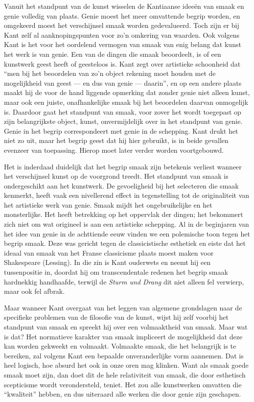 Vanuit het standpunt van de kunst wisselen de Kantiaanse ideeën van smaak en genie volledig van plaats. Genie moest het meer omvattende begrip worden, en omgekeerd moest het verschijnsel smaak worden gedevalueerd. Toch zijn er bij Kant zelf al aanknopingspunten voor zo’n omkering van waarden. Ook volgens Kant is het voor het oordelend vermogen van smaak van enig belang dat kunst het werk is van genie. Een van de dingen die smaak beoordeelt, is of een kunstwerk geest heeft of geesteloos is. Kant zegt over artistieke schoonheid dat ``men bij het beoordelen van zo’n object rekening moet houden met de mogelijkheid van geest — en dus van genie — daarin'', en op een andere plaats maakt hij de voor de hand liggende opmerking dat zonder genie niet alleen kunst, maar ook een juiste, onafhankelijke smaak bij het beoordelen daarvan onmogelijk is. Daardoor gaat het standpunt van smaak, voor zover het wordt toegepast op zijn belangrijkste object, kunst, onvermijdelijk over in het standpunt van genie. Genie in het begrip correspondeert met genie in de schepping. Kant drukt het niet zo uit, maar het begrip geest dat hij hier gebruikt, is in beide gevallen evenzeer van toepassing. Hierop moet later verder worden voortgebouwd.

Het is inderdaad duidelijk dat het begrip smaak zijn betekenis verliest wanneer het verschijnsel kunst op de voorgrond treedt. Het standpunt van smaak is ondergeschikt aan het kunstwerk. De gevoeligheid bij het selecteren die smaak kenmerkt, heeft vaak een nivellerend effect in tegenstelling tot de originaliteit van het artistieke werk van genie. Smaak mijdt het ongebruikelijke en het monsterlijke. Het heeft betrekking op het oppervlak der dingen; het bekommert zich niet om wat origineel is aan een artistieke schepping. Al in de beginjaren van het idee van genie in de achttiende eeuw vinden we een polemische toon tegen het begrip smaak. Deze was gericht tegen de classicistische esthetiek en eiste dat het ideaal van smaak van het Franse classicisme plaats moest maken voor Shakespeare (Lessing). In die zin is Kant ouderwets en neemt hij een tussenpositie in, doordat hij om transcendentale redenen het begrip smaak hardnekkig handhaafde, terwijl de \textit{Sturm und Drang} dit niet alleen fel verwierp, maar ook fel afbrak.

Maar wanneer Kant overgaat van het leggen van algemene grondslagen naar de specifieke problemen van de filosofie van de kunst, wijst hij zelf voorbij het standpunt van smaak en spreekt hij over een volmaaktheid van smaak. Maar wat is dat? Het normatieve karakter van smaak impliceert de mogelijkheid dat deze kan worden gekweekt en volmaakt. Volmaakte smaak, die het belangrijk is te bereiken, zal volgens Kant een bepaalde onveranderlijke vorm aannemen. Dat is heel logisch, hoe absurd het ook in onze oren mag klinken. Want als smaak goede smaak moet zijn, dan doet dit de hele relativiteit van smaak, die door esthetisch scepticisme wordt verondersteld, teniet. Het zou alle kunstwerken omvatten die ``kwaliteit'' hebben, en dus uiteraard alle werken die door genie zijn geschapen.

